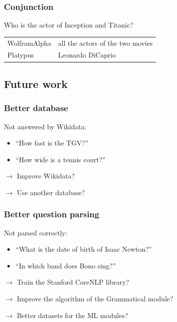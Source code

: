 \begin{frame}[fragile]
    \frametitle{Conjunction}

Who is the actor of Inception and Titanic?
    \begin{tabular}{ll}
        \alert{WolframAlpha} & all the actors of the two movies\\
        \alert{Platypus} & Leonardo DiCaprio\\
    \end{tabular}
\end{frame}


\subsection{Future work}

\begin{frame}
    \frametitle{Better database}

    Not answered by \alert{Wikidata}:
    \begin{itemize}
      \item ``How fast is the TGV?''
      \item ``How wide is a tennis court?''
    \end{itemize}

    \medbreak

    $\rightarrow$ Improve Wikidata?

    $\rightarrow$ Use another database?
\end{frame}

\begin{frame}
    \frametitle{Better question parsing}

    Not parsed correctly:
    \begin{itemize}
      \item ``What is the date of birth of Isaac Newton?''
      \item ``In which band does Bono sing?''
    \end{itemize}

    \medbreak

    $\rightarrow$ Train the Stanford \alert{CoreNLP} library?

    $\rightarrow$ Improve the algorithm of the Grammatical module?

    $\rightarrow$ Better datasets for the ML modules?
\end{frame}

